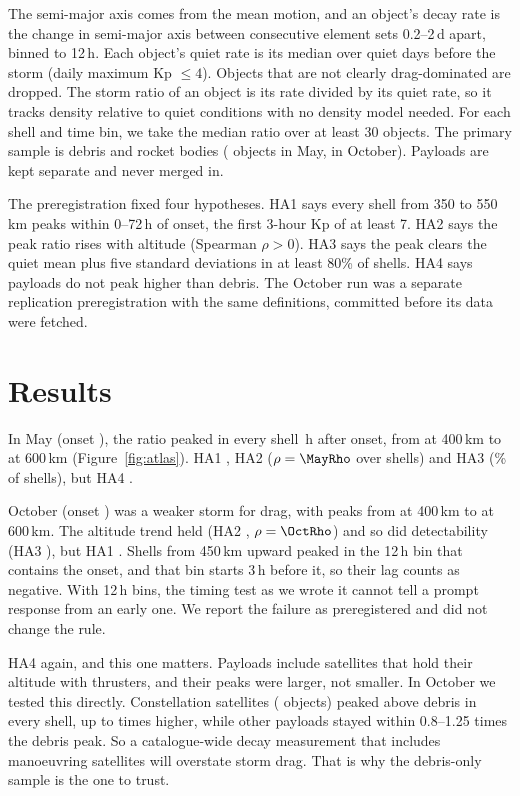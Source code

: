 \documentclass{aastex701}
\begin{document}
The semi-major axis comes from the mean motion, and an object's decay rate is the change in semi-major axis between consecutive element sets 0.2--2\,d apart, binned to 12\,h. Each object's quiet rate is its median over \MayNQuiet{} quiet days before the storm (daily maximum Kp $\leq 4$). Objects that are not clearly drag-dominated are dropped. The storm ratio of an object is its rate divided by its quiet rate, so it tracks density relative to quiet conditions with no density model needed. For each shell and time bin, we take the median ratio over at least 30 objects. The primary sample is debris and rocket bodies (\MayNPrimary{} objects in May, \OctNPrimary{} in October). Payloads are kept separate and never merged in.

The preregistration fixed four hypotheses. HA1 says every shell from 350 to 550\,km peaks within 0--72\,h of onset, the first 3-hour Kp of at least 7. HA2 says the peak ratio rises with altitude (Spearman $\rho > 0$). HA3 says the peak clears the quiet mean plus five standard deviations in at least 80\% of shells. HA4 says payloads do not peak higher than debris. The October run was a separate replication preregistration with the same definitions, committed before its data were fetched.

\section{Results}
In May (onset \MayOnset), the ratio peaked in every shell \MayLagFour\,h after onset, from \MayPeakFour{} at 400\,km to \MayPeakSix{} at 600\,km (Figure~\ref{fig:atlas}). HA1 \MayHAOne, HA2 \MayHATwo{} ($\rho = \MayRho$ over \MayNShells{} shells) and HA3 \MayHAThree{} (\MayDetectFrac\% of \MayDetectN{} shells), but HA4 \MayHAFour.

October (onset \OctOnset) was a weaker storm for drag, with peaks from \OctPeakFour{} at 400\,km to \OctPeakSix{} at 600\,km. The altitude trend held (HA2 \OctHATwo, $\rho = \OctRho$) and so did detectability (HA3 \OctHAThree), but HA1 \OctHAOne. Shells from 450\,km upward peaked in the 12\,h bin that contains the onset, and that bin starts 3\,h before it, so their lag counts as negative. With 12\,h bins, the timing test as we wrote it cannot tell a prompt response from an early one. We report the failure as preregistered and did not change the rule.

HA4 \OctHAFour{} again, and this one matters. Payloads include satellites that hold their altitude with thrusters, and their peaks were larger, not smaller. In October we tested this directly. Constellation satellites (\OctNConst{} objects) peaked above debris in every shell, up to \OctConstMaxRatio{} times higher, while other payloads stayed within 0.8--1.25 times the debris peak. So a catalogue-wide decay measurement that includes manoeuvring satellites will overstate storm drag. That is why the debris-only sample is the one to trust.
\end{document}
